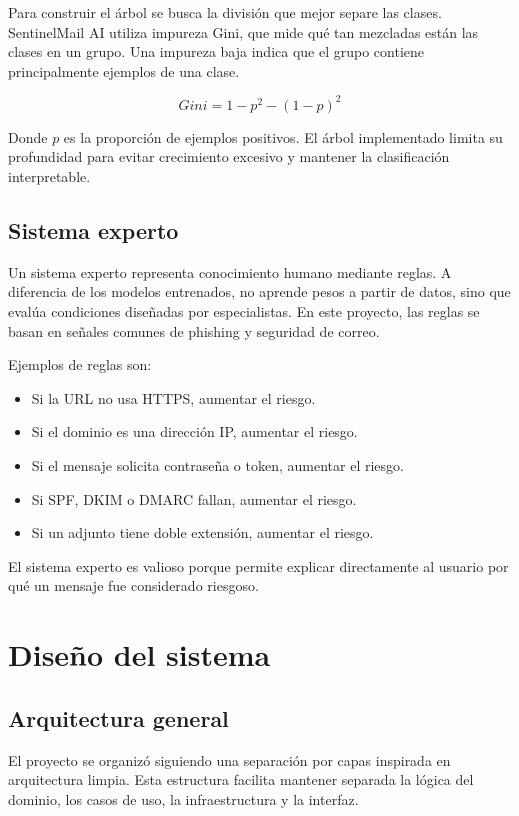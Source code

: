 \documentclass[12pt,letterpaper]{article}
\begin{document}
Para construir el árbol se busca la división que mejor separe las clases. SentinelMail AI utiliza impureza Gini, que mide qué tan mezcladas están las clases en un grupo. Una impureza baja indica que el grupo contiene principalmente ejemplos de una clase.

\[
Gini = 1 - p^2 - (1-p)^2
\]

Donde \(p\) es la proporción de ejemplos positivos. El árbol implementado limita su profundidad para evitar crecimiento excesivo y mantener la clasificación interpretable.

\subsection{Sistema experto}

Un sistema experto representa conocimiento humano mediante reglas. A diferencia de los modelos entrenados, no aprende pesos a partir de datos, sino que evalúa condiciones diseñadas por especialistas. En este proyecto, las reglas se basan en señales comunes de phishing y seguridad de correo.

Ejemplos de reglas son:

\begin{itemize}
    \item Si la URL no usa HTTPS, aumentar el riesgo.
    \item Si el dominio es una dirección IP, aumentar el riesgo.
    \item Si el mensaje solicita contraseña o token, aumentar el riesgo.
    \item Si SPF, DKIM o DMARC fallan, aumentar el riesgo.
    \item Si un adjunto tiene doble extensión, aumentar el riesgo.
\end{itemize}

El sistema experto es valioso porque permite explicar directamente al usuario por qué un mensaje fue considerado riesgoso.

\section{Diseño del sistema}

\subsection{Arquitectura general}

El proyecto se organizó siguiendo una separación por capas inspirada en arquitectura limpia. Esta estructura facilita mantener separada la lógica del dominio, los casos de uso, la infraestructura y la interfaz.
\end{document}
